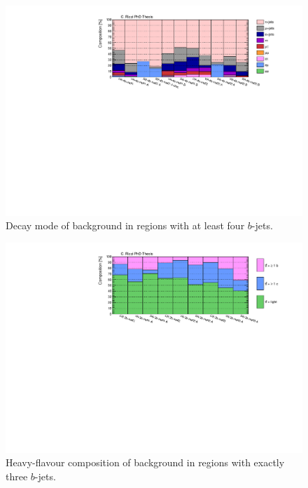 \begin{figure}[htbp]
\includegraphics[width=\textwidth]{figures/ewk_prod/comp_plots/hh_4b_tt.pdf}
\caption{Decay mode of \ttbar background in regions with at least four $b$-jets.}
	\label{fig:ttcomp_hh4b}
\end{figure}

\begin{figure}[htbp]
\includegraphics[width=\textwidth]{figures/ewk_prod/comp_plots/hh_3b_HF.pdf}
\caption{Heavy-flavour composition of \ttbar background in regions with exactly three $b$-jets.}
	\label{fig:HFcomp_hh3b}
\end{figure}


